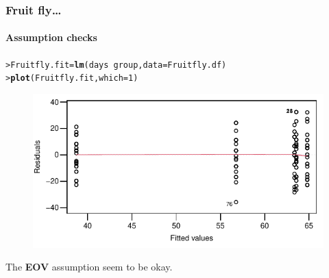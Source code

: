 \documentclass{beamer}\usepackage[]{graphicx}\usepackage[]{xcolor}
\makeatletter
\newcommand{\hlnum}[1]{\textcolor[rgb]{0.686,0.059,0.569}{#1}}%
\newcommand{\hlopt}[1]{\textcolor[rgb]{0,0,0}{#1}}%
\newcommand{\hlstd}[1]{\textcolor[rgb]{0.345,0.345,0.345}{#1}}%
\newcommand{\hlkwb}[1]{\textcolor[rgb]{0.69,0.353,0.396}{#1}}%
\newcommand{\hlkwc}[1]{\textcolor[rgb]{0.333,0.667,0.333}{#1}}%
\newcommand{\hlkwd}[1]{\textcolor[rgb]{0.737,0.353,0.396}{\textbf{#1}}}%
\newenvironment{kframe}{%
 \def\at@end@of@kframe{}%
 \ifinner\ifhmode%
  \def\at@end@of@kframe{\end{minipage}}%
  \begin{minipage}{\columnwidth}%
 \fi\fi%
 \def\FrameCommand##1{\hskip\@totalleftmargin \hskip-\fboxsep
 \colorbox{shadecolor}{##1}\hskip-\fboxsep
     \hskip-\linewidth \hskip-\@totalleftmargin \hskip\columnwidth}%
 \MakeFramed {\advance\hsize-\width
   \@totalleftmargin\z@ \linewidth\hsize
   \@setminipage}}%
 {\par\unskip\endMakeFramed%
 \at@end@of@kframe}
\newenvironment{knitrout}{}{} %
\makeatother
\begin{document}
\begin{frame}[fragile]
\frametitle{Fruit fly\ldots}
\framesubtitle{Assumption checks}

\begin{knitrout}\scriptsize
{}\color{fgcolor}\begin{kframe}
\begin{alltt}
\hlstd{> }\hlstd{Fruitfly.fit} \hlkwb{=} \hlkwd{lm}\hlstd{(days} \hlopt{~} \hlstd{group,} \hlkwc{data} \hlstd{= Fruitfly.df)}
\hlstd{> }\hlkwd{plot}\hlstd{(Fruitfly.fit,} \hlkwc{which}\hlstd{=}\hlnum{1}\hlstd{)}
\end{alltt}
\end{kframe}
\end{knitrout}



\begin{figure}
  \centering
  \includegraphics{figure/RC-H11-004}
\end{figure}

The {\bf EOV} assumption seem to be okay.
\end{frame}
\end{document}
